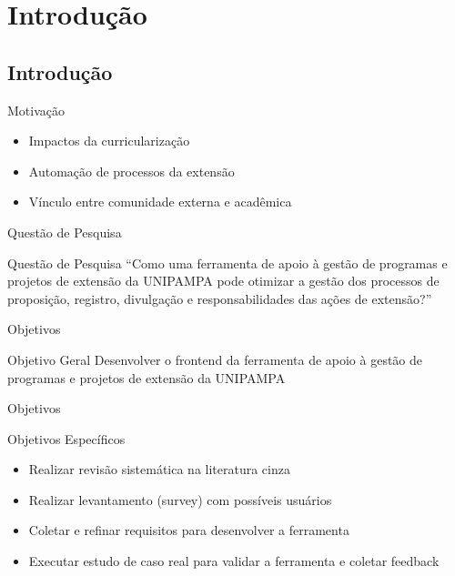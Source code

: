 \section{Introdução}
\subsection*{Introdução}

\begin{frame}{{\sffamily Motivação}}
  \begin{block}{}
    \begin{itemize}%
      \item Impactos da curricularização %
      \item Automação de processos da extensão
      \item Vínculo entre comunidade externa e acadêmica

    \end{itemize}
  \end{block}
\end{frame}

\begin{frame}{{\sffamily Questão de Pesquisa}}
  \begin{block}{Questão de Pesquisa}
    “Como uma ferramenta de apoio à gestão de programas e projetos de extensão da UNIPAMPA pode otimizar a gestão dos processos de proposição, registro, divulgação e responsabilidades das ações de extensão?”
  \end{block}
\end{frame}

\begin{frame}{{\sffamily Objetivos}}
  \begin{block}{Objetivo Geral}
    Desenvolver o frontend da ferramenta de apoio à gestão de programas e projetos de extensão da UNIPAMPA
  \end{block}
\end{frame}

\begin{frame}{{\sffamily Objetivos}}
  \begin{block}{Objetivos Específicos}
    \begin{itemize}
      \item Realizar revisão sistemática na literatura cinza
      \item Realizar levantamento (survey) com possíveis usuários
      \item Coletar e refinar requisitos para desenvolver a ferramenta
      \item Executar estudo de caso real para validar a ferramenta e coletar feedback
    \end{itemize}
  \end{block}
\end{frame}

